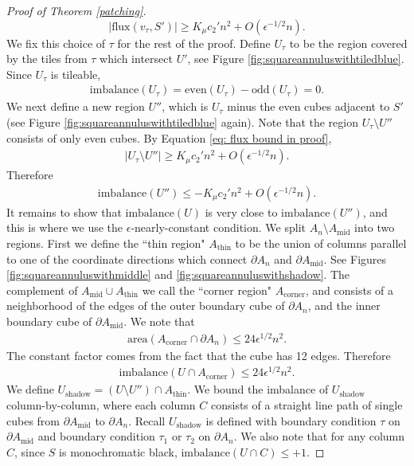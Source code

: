 \documentclass[11pt]{article}
\theoremstyle{remark}
\theoremstyle{definition}
\begin{document}
\begin{proof}[Proof of Theorem \ref{patching}]
    \begin{equation}\label{eq: flux bound in proof}
        |\text{flux}(v_\tau,S')| \geq K_{\mu}c_2'n^2 + O(\epsilon^{-1/2} n). 
    \end{equation}
    We fix this choice of $\tau$ for the rest of the proof. Define $U_\tau$ to be the region covered by the tiles from $\tau$ which intersect $U'$, see Figure \ref{fig:squareannuluswithtiledblue}. Since $U_\tau$ is tileable, 
    \begin{align*}
        \text{imbalance}(U_\tau) = \text{even}(U_\tau) - \text{odd}(U_\tau) = 0. 
    \end{align*}
    We next define a new region $U''$, which is $U_\tau$ minus the even cubes adjacent to $S'$ (see Figure \ref{fig:squareannuluswithtiledblue} again). Note that the region $U_\tau\setminus U''$ consists of only even cubes. By Equation \eqref{eq: flux bound in proof}, 
    \begin{align*}
        |U_\tau\setminus U''| \geq K_{\mu} c_2' n^2 + O(\epsilon^{-1/2}n).
    \end{align*}
    Therefore 
    \begin{align*}
        \text{imbalance}(U'') \leq -K_{\mu} c_2' n^2 + O(\epsilon^{-1/2}n).
    \end{align*}
    It remains to show that $\text{imbalance}(U)$ is very close to $\text{imbalance}(U'')$, and this is where we use the $\epsilon$-nearly-constant condition. We split $A_n\setminus A_{\text{mid}}$ into two regions. First we define the ``thin region" $A_{\text{thin}}$ to be the union of columns parallel to one of the coordinate directions which connect $\partial A_n$ and $\partial A_{\text{mid}}$. See Figures  \ref{fig:squareannuluswithmiddle} and \ref{fig:squareannuluswithshadow}. The complement of $A_{\text{mid}}\cup A_{\text{thin}}$ we call the ``corner region" $A_{\text{corner}}$, and consists of a neighborhood of the edges of the outer boundary cube of $\partial A_n$, and the inner boundary cube of $\partial A_{\text{mid}}$. We note that 
    \begin{align*}
        \text{area}(A_{\text{corner}}\cap \partial A_n) \leq 24 \epsilon^{1/2} n^2.
    \end{align*}
    The constant factor comes from the fact that the cube has 12 edges. Therefore
    \begin{align*}
        \text{imbalance}(U\cap A_{\text{corner}}) \leq 24 \epsilon^{1/2} n^2.
    \end{align*}
    We define $U_{\text{shadow}} = (U\setminus U'')\cap A_{\text{thin}}$. We bound the imbalance of $U_{\text{shadow}}$ column-by-column, where each column $C$ consists of a straight line path of single cubes from $\partial A_{\text{mid}}$ to $\partial A_n$. Recall $U_{\text{shadow}}$ is defined with boundary condition $\tau$ on $\partial A_{\text{mid}}$ and boundary condition $\tau_1$ or $\tau_2$ on $\partial A_n$. We also note that for any column $C$, since $S$ is monochromatic black, $\text{imbalance}(U\cap C)\leq +1$.


\end{proof}
\end{document}
